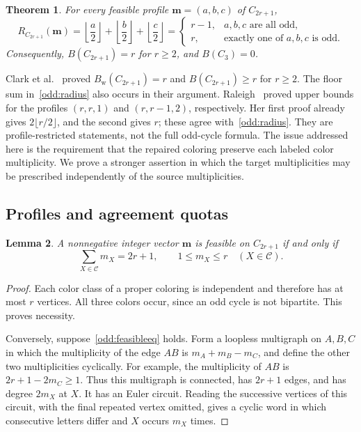 \documentclass[10pt,a4paper]{amsart}
\numberwithin{equation}{section}
\newtheorem{theorem}{Theorem}[section]
\newtheorem{lemma}[theorem]{Lemma}
\theoremstyle{definition}
\theoremstyle{remark}
\begin{document}
\begin{theorem}\label{odd:main}
For every feasible profile $\mathbf m=(a,b,c)$ of $C_{2r+1}$,
\begin{equation}\label{odd:radius}
R_{C_{2r+1}}(\mathbf m)
=\left\lfloor\frac a2\right\rfloor
 +\left\lfloor\frac b2\right\rfloor
 +\left\lfloor\frac c2\right\rfloor
=\begin{cases}
r-1,&a,b,c\text{ are all odd},\\
r,&\text{exactly one of }a,b,c\text{ is odd}.
\end{cases}
\end{equation}
Consequently,
$B(C_{2r+1})=r$ for $r\ge2$, and $B(C_3)=0$.
\end{theorem}

Clark et al.~\cite[Proposition~3.5 and Corollary~3.6]{clark2006}
proved $B_{\mathrm w}(C_{2r+1})=r$ and $B(C_{2r+1})\ge r$ for $r\ge2$.
The floor sum in~\eqref{odd:radius} also occurs in their argument.
Raleigh~\cite[Theorems~7--8]{raleigh2018} proved upper bounds for the
profiles $(r,r,1)$ and $(r,r-1,2)$, respectively. Her first proof
already gives $2\lfloor r/2\rfloor$, and the second gives $r$;
these agree with~\eqref{odd:radius}. They are profile-restricted
statements, not the full odd-cycle formula.
The issue addressed here is the requirement that the repaired coloring
preserve each labeled color multiplicity. We prove a stronger assertion
in which the target multiplicities may be prescribed independently of
the source multiplicities.

\subsection{Profiles and agreement quotas}

\begin{lemma}\label{odd:feasible}
A nonnegative integer vector $\mathbf m$ is feasible on $C_{2r+1}$
if and only if
\begin{equation}\label{odd:feasibleeq}
\sum_{X\in\mathcal C}m_X=2r+1,
\qquad 1\le m_X\le r\quad(X\in\mathcal C).
\end{equation}
\end{lemma}
\begin{proof}
Each color class of a proper coloring is independent and therefore has
at most $r$ vertices. All three colors occur, since an odd cycle is not
bipartite. This proves necessity.

Conversely, suppose~\eqref{odd:feasibleeq} holds. Form a loopless
multigraph on $A,B,C$ in which the multiplicity of the edge $AB$ is
$m_A+m_B-m_C$, and define the other two multiplicities cyclically.
For example, the multiplicity of $AB$ is $2r+1-2m_C\ge1$.
Thus this multigraph is connected, has $2r+1$ edges, and has degree
$2m_X$ at $X$. It has an Euler circuit. Reading the successive vertices
of this circuit, with the final repeated vertex omitted, gives a cyclic
word in which consecutive letters differ and $X$ occurs $m_X$ times.
\end{proof}
\end{document}
